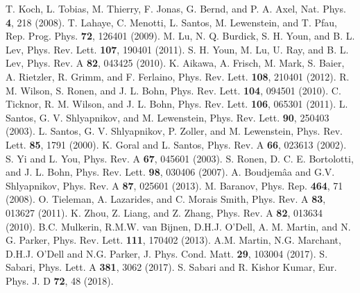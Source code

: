 \documentclass[amsmath,amssymb,article,twocolumn,superscriptaddress,showpacs,10pt]{revtex4-1}
\begin{document}
\begin{thebibliography}{99}%
 T. Koch, L. Tobias, M. Thierry, F. Jonas, G. Bernd, and P. A. Axel, Nat. Phys. \textbf{4}, 218 (2008).
 T. Lahaye, C. Menotti, L. Santos, M. Lewenstein, and T. Pfau, Rep. Prog. Phys. \textbf{72}, 126401 (2009).
 M. Lu, N. Q. Burdick, S. H. Youn, and B. L. Lev, Phys. Rev. Lett. \textbf{107}, 190401 (2011).
 S. H. Youn, M. Lu, U. Ray, and B. L. Lev, Phys. Rev. A \textbf{82}, 043425 (2010).
 K. Aikawa, A. Frisch, M. Mark, S. Baier, A. Rietzler, R. Grimm, and F. Ferlaino, Phys. Rev. Lett. \textbf{108}, 210401 (2012).
 R. M. Wilson, S. Ronen, and J. L. Bohn, Phys. Rev. Lett. \textbf{104}, 094501 (2010).
 C. Ticknor, R. M. Wilson, and J. L. Bohn, Phys. Rev. Lett. \textbf{106}, 065301 (2011).
 L. Santos, G. V. Shlyapnikov, and M. Lewenstein, Phys. Rev. Lett. \textbf{90}, 250403 (2003).
 L. Santos, G. V. Shlyapnikov, P. Zoller, and M. Lewenstein, Phys. Rev. Lett. \textbf{85}, 1791 (2000).
 K. Goral and L. Santos, Phys. Rev. A \textbf{66}, 023613 (2002).
 S. Yi and L. You, Phys. Rev. A \textbf{67}, 045601 (2003).
 S. Ronen, D. C. E. Bortolotti, and J. L. Bohn, Phys. Rev. Lett. \textbf{98}, 030406 (2007).
 A. Boudjem\^aa and G.V. Shlyapnikov, Phys. Rev. A \textbf{87}, 025601 (2013).
 M. Baranov, Phys. Rep. \textbf{464}, 71 (2008).
 O. Tieleman, A. Lazarides, and C. Morais Smith, Phys. Rev. A \textbf{83}, 013627 (2011).
 K. Zhou, Z. Liang, and Z. Zhang, Phys. Rev. A \textbf{82}, 013634 (2010).
 B.C. Mulkerin, R.M.W. van Bijnen, D.H.J. O’Dell, A. M. Martin, and N. G. Parker, Phys. Rev. Lett. \textbf{111}, 170402 (2013).
 A.M. Martin, N.G. Marchant, D.H.J. O’Dell and N.G. Parker, J. Phys. Cond. Matt. \textbf{29}, 103004 (2017).
S. Sabari, Phys. Lett. A \textbf{381}, 3062 (2017).
S. Sabari and R. Kishor Kumar, Eur. Phys. J. D \textbf{72}, 48 (2018).


\end{thebibliography}
\end{document}
